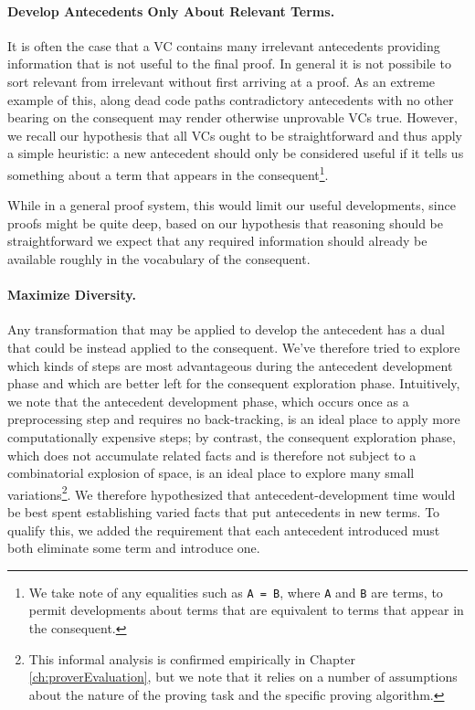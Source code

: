 \paragraph{Develop Antecedents Only About Relevant Terms.}  It is often the case that a VC contains many irrelevant antecedents providing information that is not useful to the final proof.  In general it is not possibile to sort relevant from irrelevant without first arriving at a proof.  As an extreme example of this, along dead code paths contradictory antecedents with no other bearing on the consequent may render otherwise unprovable VCs true.  However, we recall our hypothesis that all VCs ought to be straightforward and thus apply a simple heuristic: a new antecedent should only be considered useful if it tells us something about a term that appears in the consequent\footnote{We take note of any equalities such as \texttt{A = B}, where \texttt{A} and \texttt{B} are terms, to permit developments about terms that are equivalent to terms that appear in the consequent.}.

While in a general proof system, this would limit our useful developments, since proofs might be quite deep, based on our hypothesis that reasoning should be straightforward we expect that any required information should already be available roughly in the vocabulary of the consequent.

\paragraph{Maximize Diversity.}  Any transformation that may be applied to develop the antecedent has a dual that could be instead applied to the consequent.  We've therefore tried to explore which kinds of steps are most advantageous during the antecedent development phase and which are better left for the consequent exploration phase.  Intuitively, we note that the antecedent development phase, which occurs once as a preprocessing step and requires no back-tracking, is an ideal place to apply more computationally expensive steps; by contrast, the consequent exploration phase, which does not accumulate related facts and is therefore not subject to a combinatorial explosion of space, is an ideal place to explore many small variations\footnote{This informal analysis is confirmed empirically in Chapter \ref{ch:proverEvaluation}, but we note that it relies on a number of assumptions about the nature of the proving task and the specific proving algorithm.}.  We therefore hypothesized that antecedent-development time would be best spent establishing varied facts that put antecedents in new terms.  To qualify this, we added the requirement that each antecedent introduced must both eliminate some term and introduce one.

